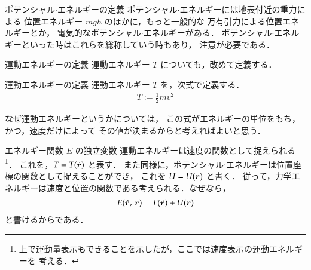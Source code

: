 \begin{mysmallsec}{ポテンシャル$\cdot$エネルギーの定義}
                ポテンシャル$\cdot$エネルギーには地表付近の重力による
                位置エネルギー $mgh$ のほかに，もっと一般的な
                万有引力による位置エネルギーとか，
                電気的なポテンシャル$\cdot$エネルギーがある．
                ポテンシャル$\cdot$エネルギーといった時はこれらを総称していう時もあり，
                注意が必要である．
            \end{mysmallsec}

            \begin{mysmallsec}{運動エネルギーの定義}
                運動エネルギー $T$ についても，改めて定義する．
                    \begin{myshadebox}{運動エネルギーの定義}
                        運動エネルギー $T$ を，次式で定義する．
                        \begin{align}
                        T := \frac{1}{2}mv^{2}
                        \end{align}
                    \end{myshadebox}

                なぜ運動エネルギーというかについては，
                この式がエネルギーの単位をもち，かつ，速度だけによって
                その値が決まるからと考えればよいと思う．
            \end{mysmallsec}

            \begin{mysmallsec}{エネルギー関数 $E$ の独立変数}
                運動エネルギーは速度の関数として捉えられる
                    \footnote{
                        上で運動量表示もできることを示したが，ここでは速度表示の運動エネルギーを
                        考える．
                    }．
                これを，$T=T(\dot{\boldsymbol{r}})$ と表す．
                また同様に，ポテンシャル$\cdot$エネルギーは位置座標の関数として捉えることができ，
                これを $U=U(\boldsymbol{r})$ と書く．
                従って，力学エネルギーは速度と位置の関数である考えられる．なぜなら，
                \begin{align}
                E(\dot{\boldsymbol{r}},\,\boldsymbol{r})=T(\dot{\boldsymbol{r}})+U(\boldsymbol{r})
                \end{align}
                と書けるからである．
            \end{mysmallsec}

